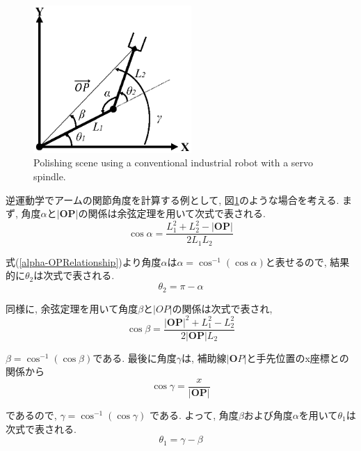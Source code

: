 \documentclass{suribt}
\begin{document}
\begin{figure}[ht]
 \begin{center}
  \includegraphics[width=60mm,clip]{./figure/2rink.eps}
  \caption{Polishing scene using a conventional industrial robot with a servo spindle.}
  \label{fig:2rink}
 \end{center}
\end{figure}

逆運動学でアームの関節角度を計算する例として, 図\ref{fig:2rink}のような場合を考える. まず, 角度$\alpha$と$|{\bm {OP}}|$の関係は余弦定理を用いて次式で表される.
\begin{equation}
		\label{alpha-OPRelationship}
		\cos \alpha = \frac{L^2_1 + L^2_2 - |{\bm {OP}}|}{2 L_1 L_2}
\end{equation}

式(\ref{alpha-OPRelationship})より角度$\alpha$は$\alpha = \cos^{-1}(\cos \alpha)$と表せるので, 結果的に$\theta_2$は次式で表される.
\begin{equation}
	\theta_2 = \pi - \alpha
\end{equation}

同様に, 余弦定理を用いて角度$\beta$と$|OP|$の関係は次式で表され,
\[
	\cos \beta = \frac{|{\bm {OP}}|^2 + L^2_1 - L^2_2}{2 |{\bm {OP}}| L_2}
\]

$\beta = \cos^{-1}(\cos \beta)$である. 最後に角度$\gamma$は, 補助線$|{\bm OP}|$と手先位置のx座標との関係から
\[
	\cos \gamma = \frac{x}{|{\bm {OP}}|}
\]

であるので, $\gamma = \cos^{-1}(\cos \gamma)$ である. よって, 角度$\beta$および角度$\alpha$を用いて$\theta_1$は次式で表される.
\begin{equation}
	\theta_1 = \gamma - \beta
\end{equation}
\end{document}
